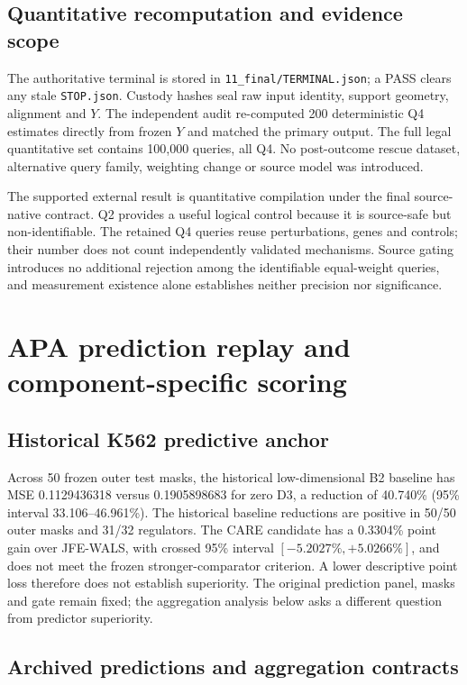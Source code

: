 \documentclass[11pt]{article}
\begin{document}
\subsection{Quantitative recomputation and evidence scope}
The authoritative terminal is stored in \texttt{11\_final/TERMINAL.json}; a PASS clears any stale \texttt{STOP.json}. Custody hashes seal raw input identity, support geometry, alignment and $Y$. The independent audit re-computed 200 deterministic Q4 estimates directly from frozen $Y$ and matched the primary output. The full legal quantitative set contains 100,000 queries, all Q4. No post-outcome rescue dataset, alternative query family, weighting change or source model was introduced.

The supported external result is quantitative compilation under the final source-native contract. Q2 provides a useful logical control because it is source-safe but non-identifiable. The retained Q4 queries reuse perturbations, genes and controls; their number does not count independently validated mechanisms. Source gating introduces no additional rejection among the identifiable equal-weight queries, and measurement existence alone establishes neither precision nor significance.



\section{APA prediction replay and component-specific scoring}


\subsection{Historical K562 predictive anchor}
Across 50 frozen outer test masks, the historical low-dimensional B2 baseline has MSE 0.1129436318 versus 0.1905898683 for zero D3, a reduction of 40.740\% (95\% interval 33.106--46.961\%). The historical baseline reductions are positive in 50/50 outer masks and 31/32 regulators. The CARE candidate has a 0.3304\% point gain over JFE-WALS, with crossed 95\% interval $[-5.2027\%,+5.0266\%]$, and does not meet the frozen stronger-comparator criterion. A lower descriptive point loss therefore does not establish superiority. The original prediction panel, masks and gate remain fixed; the aggregation analysis below asks a different question from predictor superiority.



\subsection{Archived predictions and aggregation contracts}
\end{document}
